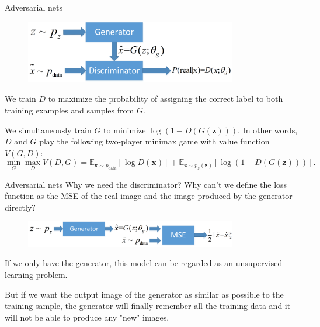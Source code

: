 \documentclass[10pt]{beamer}
\begin{document}
	\begin{frame}{Adversarial nets}
		\begin{figure}
			\includegraphics[width=25em]{figures/GAN-general-structure.png}
		\end{figure}
		\pause
		We train $D$ to maximize the probability of assigning the correct label to both training examples and samples from $G$.
		
		\pause
		We simultaneously train $G$ to minimize $\log(1-D(G(\bm{z})))$. In other words, $D$ and $G$ play the following two-player minimax game with value function $V(G,D)$:
		\pause
		$$
		\mathop{\min}_{G}\mathop{\max}_{D}V(D,G)=\mathbb{E}_{\bm{x}\sim p_{\text{data}}}\left[\log D(\bm{x})\right]+\mathbb{E}_{\bm{z}\sim p_z(\bm{z})}\left[\log(1-D(G(\bm{z})))\right].
		$$
		
	\end{frame}

	\begin{frame}{Adversarial nets}
		\onslide<1->
		Why we need the discriminator? Why can't we define the loss function as the MSE of the real image and the image produced by the generator directly?
		\onslide<2->
		\begin{figure}
			\includegraphics<2->[width=25em]{figures/GAN-hypothesis-structure.png}
		\end{figure}
		If we only have the generator, this model can be regarded as an unsupervised learning problem. 
		
		But if we want the output image of the generator as similar as possible to the training sample, the generator will finally remember all the training data and it will not be able to produce any "new" images.
	\end{frame}
\end{document}
